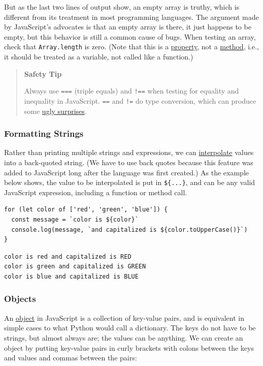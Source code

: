 But as the last two lines of output show, an empty array is truthy,
which is different from its treatment in most programming languages. The
argument made by JavaScript's advocates is that an empty array is there,
it just happens to be empty, but this behavior is still a common cause
of bugs. When testing an array, check that \texttt{Array.length} is
zero. (Note that this is a \protect\hyperlink{g:property}{property}, not
a \protect\hyperlink{g:method}{method}, i.e., it should be treated as a
variable, not called like a function.)

\begin{quote}
\textbf{Safety Tip}

Always use \texttt{===} (triple equals) and \texttt{!==} when testing
for equality and inequality in JavaScript. \texttt{==} and \texttt{!=}
do type conversion, which can produce some
\protect\hyperlink{s:legacy-equality}{ugly surprises}.
\end{quote}

\subsubsection{Formatting Strings}\label{s:basics-formatting}

Rather than printing multiple strings and expressions, we can
\protect\hyperlink{g:string-interpolation}{interpolate} values into a
back-quoted string. (We have to use back quotes because this feature was
added to JavaScript long after the language was first created.) As the
example below shows, the value to be interpolated is put in
\texttt{\$\{...\}}, and can be any valid JavaScript expression,
including a function or method call.

\begin{verbatim}
for (let color of ['red', 'green', 'blue']) {
  const message = `color is ${color}`
  console.log(message, `and capitalized is ${color.toUpperCase()}`)
}
\end{verbatim}

\begin{verbatim}
color is red and capitalized is RED
color is green and capitalized is GREEN
color is blue and capitalized is BLUE
\end{verbatim}

\subsubsection{Objects}\label{s:basics-objects}

An \protect\hyperlink{g:object}{object} in JavaScript is a collection of
key-value pairs, and is equivalent in simple cases to what Python would
call a dictionary. The keys do not have to be strings, but almost always
are; the values can be anything. We can create an object by putting
key-value pairs in curly brackets with colons between the keys and
values and commas between the pairs:

